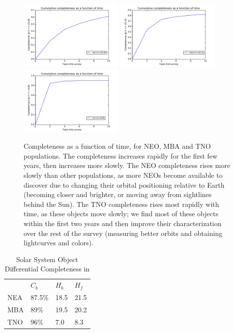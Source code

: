 \begin{figure}
\includegraphics[width=2in]{figs/solarsystem/minion_1016_neo_CompletenessOverTime_22_time.pdf}
\includegraphics[width=2in]{figs/solarsystem/minion_1016_mba_CompletenessOverTime_20_time.pdf}
\includegraphics[width=2in]{figs/solarsystem/minion_1016_tno_CompletenessOverTime_8_time.pdf}
\caption{Completeness as a function of time, for NEO, MBA and TNO
  populations. The completeness increases rapidly for the first few
  years, then increases more slowly. The NEO completeness rises more
  slowly than other populations, as more NEOs become available to
  discover due to changing their orbital positioning relative to Earth
  (becoming closer and brighter, or moving away from sightlines behind
  the Sun). The TNO completeness rises most rapidly with time, as
  these objects move slowly; we find most of these objects within the
  first two years and then improve their characterization over the
  rest of the survey (measuring better orbits and obtaining
  lightcurves and colors).
\label{completeness_time}}
\end{figure}

\begin{table}[]
\centering
\caption{Solar System Object Differential Completeness in }
\label{ssoperf}
\begin{tabular}{llll}
    & $C_b$ & $H_b$ & $H_f$ \\
NEA & 87.5\%  & 18.5  & 21.5  \\
MBA & 89\%  & 19.5  & 20.2  \\
TNO & 96\%  & 7.0   & 8.3
\end{tabular}
\end{table}



